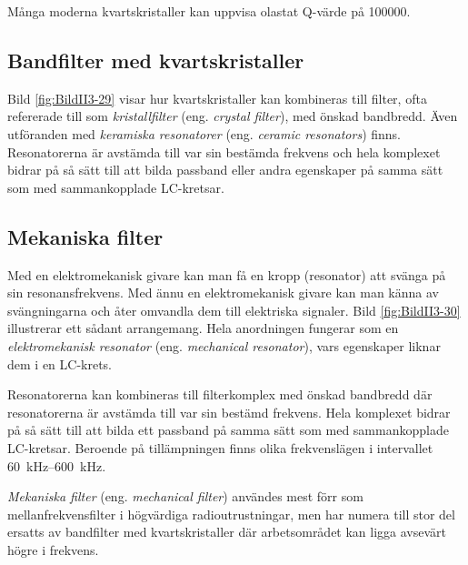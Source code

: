 Många moderna kvartskristaller kan uppvisa olastat Q-värde på 100000.

\vspace{12pt} %

\subsection{Bandfilter med kvartskristaller}
\label{bandfilter_kristall}


Bild \ref{fig:BildII3-29} visar hur kvartskristaller kan kombineras till
filter, ofta refererade till som \emph{kristallfilter} (eng.
\emph{crystal filter}), med önskad bandbredd.
Även utföranden med \emph{keramiska resonatorer} (eng.
\emph{ceramic resonators}) finns.
Resonatorerna är avstämda till var sin bestämda frekvens och hela komplexet
bidrar på så sätt till att bilda passband eller andra egenskaper på samma sätt
som med sammankopplade LC-kretsar.

\subsection{Mekaniska filter}

Med en elektromekanisk givare kan man få en kropp (resonator) att svänga på sin
resonansfrekvens.
Med ännu en elektromekanisk givare kan man känna av svängningarna och
åter omvandla dem till elektriska signaler.
Bild \ref{fig:BildII3-30} illustrerar ett sådant arrangemang.
Hela anordningen fungerar som en \emph{elektromekanisk resonator} (eng.
\emph{mechanical resonator}), vars egenskaper liknar dem i en LC-krets.


Resonatorerna kan kombineras till filterkomplex med önskad bandbredd där
resonatorerna är avstämda till var sin bestämd frekvens.
Hela komplexet bidrar på så sätt till att bilda ett passband på samma sätt som
med sammankopplade LC-kretsar.
Beroende på tillämpningen finns olika frekvenslägen i intervallet
\SIrange{60}{600}{\kilo\hertz}.

\emph{Mekaniska filter} (eng. \emph{mechanical filter}) användes mest förr som
mellanfrekvensfilter i högvärdiga radioutrustningar, men har numera till stor
del ersatts av bandfilter med kvartskristaller där arbetsområdet kan ligga
avsevärt högre i frekvens.

